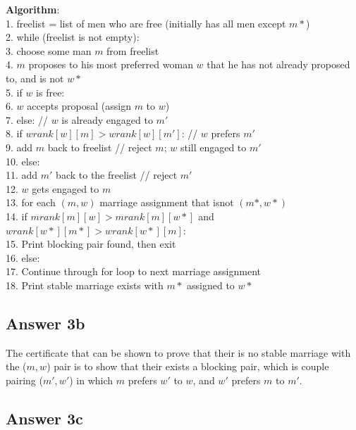 \documentclass[twoside]{article}
\begin{document}
\textbf{Algorithm}:\\
1. freelist = list of men who are free (initially has all men except $m*$) \\
2. while (freelist is not empty): \\
\hspace*{7mm} 3. choose some man $m$ from freelist \\
\hspace*{7mm} 4. $m$ proposes to his most preferred woman $w$ that he has not already proposed to, and is not $w*$ \\
\hspace*{7mm} 5. if $w$ is free: \\
\hspace*{14mm} 6. $w$ accepts proposal (assign $m$ to $w$) \\ 
\hspace*{7mm} 7. else: // $w$ is already engaged to $m′$ \\
\hspace*{14mm} 8. if $wrank[w][m] > wrank[w][m′]$: // $w$ prefers $m′$ \\
\hspace*{21mm} 9. add $m$ back to freelist // reject $m$; $w$ still engaged to $m′$ \\
\hspace*{14mm} 10. else: \\
\hspace*{21mm} 11. add $m′$ back to the freelist // reject $m′$ \\ 
\hspace*{21mm} 12. $w$ gets engaged to $m$ \\
13. for each $(m, w)$ marriage assignment that isnot $(m*, w*)$ \\
\hspace*{14mm} 14. if $mrank[m][w] > mrank[m][w*]$ and $wrank[w*][m*] > wrank[w*][m]$: \\
\hspace*{21mm} 15. Print blocking pair found, then exit \\
\hspace*{14mm} 16. else: \\
\hspace*{21mm} 17. Continue through for loop to next marriage assignment \\ 
18. Print stable marriage exists with $m*$ assigned to $w*$

\subsection{Answer 3b}

The certificate that can be shown to prove that their is no stable marriage with the ($m, w$) pair is to show that their exists a blocking pair, which is couple pairing ($m', w'$) in which  $m$ prefers $w'$ to $w$, and $w'$ prefers $m$ to $m'$.  

\subsection{Answer 3c}
\end{document}
